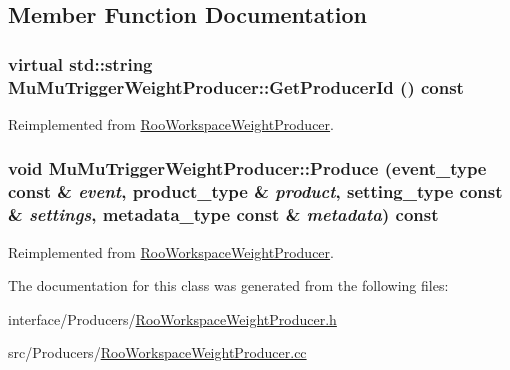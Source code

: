 \subsection{Member Function Documentation}
\hypertarget{classMuMuTriggerWeightProducer_aceeaf94e1e0b6fa4128b3f0b3ebec900}{
\subsubsection[{GetProducerId}]{\setlength{\rightskip}{0pt plus 5cm}virtual std::string MuMuTriggerWeightProducer::GetProducerId () const}}
\label{classMuMuTriggerWeightProducer_aceeaf94e1e0b6fa4128b3f0b3ebec900}


Reimplemented from \hyperlink{classRooWorkspaceWeightProducer_a40f7cc577a5dbf0504fc9f3c1670a0a2}{RooWorkspaceWeightProducer}.\hypertarget{classMuMuTriggerWeightProducer_a0b8559ad9c392e68d1272ca49ad65a93}{
\subsubsection[{Produce}]{\setlength{\rightskip}{0pt plus 5cm}void MuMuTriggerWeightProducer::Produce (event\_\-type const \& {\em event}, \/  product\_\-type \& {\em product}, \/  setting\_\-type const \& {\em settings}, \/  metadata\_\-type const \& {\em metadata}) const}}
\label{classMuMuTriggerWeightProducer_a0b8559ad9c392e68d1272ca49ad65a93}


Reimplemented from \hyperlink{classRooWorkspaceWeightProducer_afd139b8380a91e8aaa72066a8a826350}{RooWorkspaceWeightProducer}.

The documentation for this class was generated from the following files:\begin{DoxyCompactItemize}
\item 
interface/Producers/\hyperlink{RooWorkspaceWeightProducer_8h}{RooWorkspaceWeightProducer.h}\item 
src/Producers/\hyperlink{RooWorkspaceWeightProducer_8cc}{RooWorkspaceWeightProducer.cc}\end{DoxyCompactItemize}
